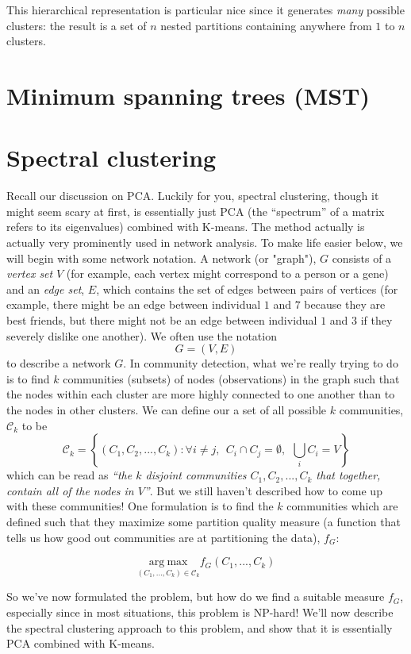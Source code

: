 This hierarchical representation is particular nice since it generates \emph{many} possible clusters: the result is a set of $n$ nested partitions containing anywhere from $1$ to $n$ clusters.

\section{Minimum spanning trees (MST)}

\section{Spectral clustering}

Recall our discussion on PCA. Luckily for you, spectral clustering, though it might seem scary at first, is essentially just PCA (the ``spectrum'' of a matrix refers to its eigenvalues) combined with K-means. The method actually is actually very prominently used in network analysis. To make life easier below, we will begin with some network notation. A network (or "graph"), $G$ consists of a \emph{vertex set} $V$ (for example, each vertex might correspond to a person or a gene) and an \emph{edge set}, $E$, which contains the set of edges between pairs of vertices (for example, there might be an edge between individual $1$ and $7$ because they are best friends, but there might not be an edge between individual $1$ and $3$ if they severely dislike one another). We often use the notation
$$G = (V, E)$$
to describe a network $G$. In community detection, what we're really trying to do is to find $k$ communities (subsets) of nodes (observations) in the graph such that the nodes within each cluster are more highly connected to one another than to the nodes in other clusters. We can define our a set of all possible $k$ communities, $\mathcal{C}_k$ to be
$$\mathcal{C}_k = \left\{ (C_1, C_2, ..., C_k) : \forall i \neq j, ~~ C_i \cap C_j = \emptyset, ~ ~ \bigcup_i C_i = V \right\}$$
which can be read as \emph{``the $k$ disjoint communities $C_1, C_2, ..., C_k$ that together, contain all of the nodes in $V$''}. But we still haven't described how to come up with these communities! One formulation is to find the $k$ communities which are defined such that they maximize some partition quality measure (a function that tells us how good out communities are at partitioning the data), $f_G$:

$$\underset{(C_1, ..., C_k) \in \mathcal{C}_k}{\text{arg}~\text{max}}f_G(C_1, ..., C_k)$$

So we've now formulated the problem, but how do we find a suitable measure $f_G$, especially since in most situations, this problem is NP-hard! We'll now describe the spectral clustering approach to this problem, and show that it is essentially PCA combined with K-means.

